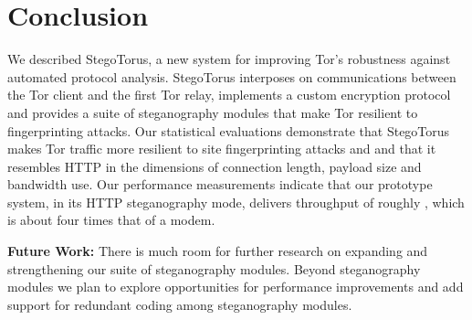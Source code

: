 \section{Conclusion}\label{s:conclusion}
We described StegoTorus, a new system for improving Tor's robustness
against automated protocol analysis.  StegoTorus interposes on
communications between the Tor client and the first Tor relay,
implements a custom encryption protocol and provides a suite of
steganography modules that make Tor resilient to fingerprinting
attacks.  Our statistical evaluations demonstrate that StegoTorus
makes Tor traffic more resilient to site fingerprinting attacks and
and that it resembles HTTP in the dimensions of connection length,
payload size and bandwidth use.  Our performance measurements indicate
that our prototype system, in its HTTP steganography mode, delivers
throughput of roughly , which is about four times that of a
 modem.

\smallskip\noindent\textbf{Future Work:} There is much room for
further research on expanding and strengthening our suite of
steganography modules.  Beyond steganography modules we plan to
explore opportunities for performance improvements and add support for
redundant coding among steganography modules.
